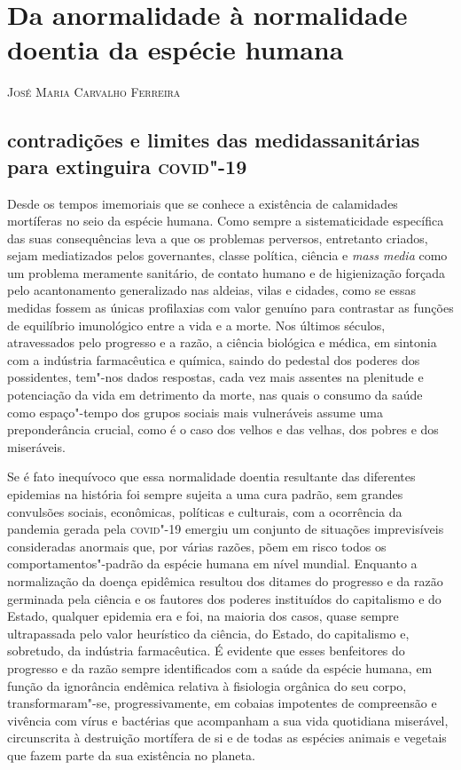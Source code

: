 \chapter[Da anormalidade à normalidade doentia da espécie humana, \emph{por José Maria Carvalho Ferreira}]{Da anormalidade à normalidade\\ doentia da espécie humana}

\begin{flushright}
\textsc{José Maria Carvalho Ferreira}
\end{flushright}

\section{contradições e limites das medidas\break sanitárias para extinguira \textsc{covid}"-19}

\noindent{}Desde os tempos imemoriais que se conhece a existência de calamidades
mortíferas no seio da espécie humana. Como sempre a sistematicidade
específica das suas consequências leva a que os problemas perversos,
entretanto criados, sejam mediatizados pelos governantes, classe
política, ciência e \emph{mass media} como um problema meramente
sanitário, de contato humano e de higienização forçada pelo
acantonamento generalizado nas aldeias, vilas e cidades, como se essas
medidas fossem as únicas profilaxias com valor genuíno para contrastar
as funções de equilíbrio imunológico entre a vida e a morte. Nos últimos
séculos, atravessados pelo progresso e a razão, a ciência biológica e
médica, em sintonia com a indústria farmacêutica e química, saindo do
pedestal dos poderes dos possidentes, tem"-nos dados respostas, cada vez
mais assentes na plenitude e potenciação da vida em detrimento da morte,
nas quais o consumo da saúde como espaço"-tempo dos grupos sociais mais
vulneráveis assume uma preponderância crucial, como é o caso dos velhos
e das velhas, dos pobres e dos miseráveis.

Se é fato inequívoco que essa normalidade doentia resultante das
diferentes epidemias na história foi sempre sujeita a uma cura padrão,
sem grandes convulsões sociais, econômicas, políticas e culturais, com a
ocorrência da pandemia gerada pela \textsc{covid}"-19 emergiu um conjunto de
situações imprevisíveis consideradas anormais que, por várias razões,
põem em risco todos os comportamentos"-padrão da espécie humana em nível
mundial. Enquanto a normalização da doença epidêmica resultou dos
ditames do progresso e da razão germinada pela ciência e os fautores dos
poderes instituídos do capitalismo e do Estado, qualquer epidemia era e
foi, na maioria dos casos, quase sempre ultrapassada pelo valor
heurístico da ciência, do Estado, do capitalismo e, sobretudo, da
indústria farmacêutica. É evidente que esses benfeitores do progresso e
da razão sempre identificados com a saúde da espécie humana, em função
da ignorância endêmica relativa à fisiologia orgânica do seu corpo,
transformaram"-se, progressivamente, em cobaias impotentes de compreensão
e vivência com vírus e bactérias que acompanham a sua vida quotidiana
miserável, circunscrita à destruição mortífera de si e de todas as
espécies animais e vegetais que fazem parte da sua existência no
planeta.

